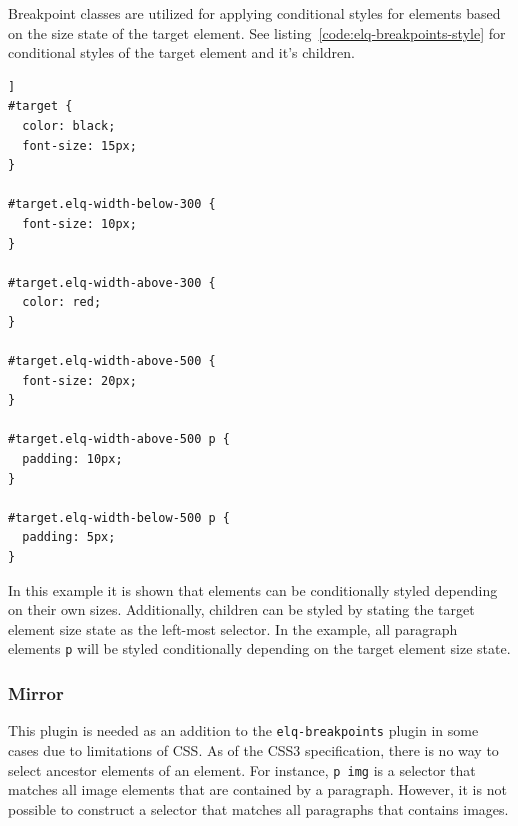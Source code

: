 \documentclass[a4paper,11pt]{kth-mag}
\newcommand{\code}[1]{\texttt{#1}}
\begin{document}
            Breakpoint classes are utilized for applying conditional styles for elements based on the size state of the target element.
            See listing~\ref{code:elq-breakpoints-style} for conditional styles of the target element and it's children.
            \begin{lstlisting}[caption={Example of conditional styles using the \code{elq-breakpoints} plugin classes},captionpos=b,label={code:elq-breakpoints-style}]]
#target {
  color: black;
  font-size: 15px;
}

#target.elq-width-below-300 {
  font-size: 10px;
}

#target.elq-width-above-300 {
  color: red;
}

#target.elq-width-above-500 {
  font-size: 20px;
}

#target.elq-width-above-500 p {
  padding: 10px;
}

#target.elq-width-below-500 p {
  padding: 5px;
}
            \end{lstlisting}
            In this example it is shown that elements can be conditionally styled depending on their own sizes.
            Additionally, children can be styled by stating the target element size state as the left-most selector.
            In the example, all paragraph elements \code{p} will be styled conditionally depending on the target element size state.


          \subsubsection{Mirror}
            This plugin is needed as an addition to the \code{elq-breakpoints} plugin in some cases due to limitations of CSS.
            As of the \gls{CSS3} specification, there is no way to select ancestor elements of an element.
            For instance, \code{p img} is a selector that matches all image elements that are contained by a paragraph.
            However, it is not possible to construct a selector that matches all paragraphs that contains images.
\end{document}
